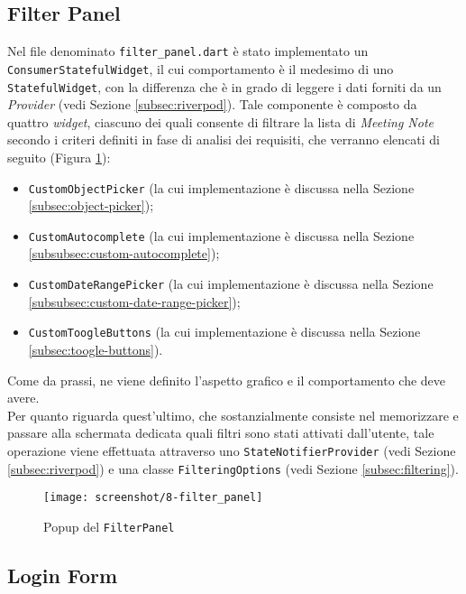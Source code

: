 \subsection{Filter Panel}
\label{subsec:filter-panel}

Nel file denominato \lstinline{filter_panel.dart} è stato implementato un \lstinline{ConsumerStatefulWidget}\cite{site:reading-provider}, il cui comportamento è il medesimo di uno \lstinline{StatefulWidget}, con la differenza che è in grado di leggere i dati forniti da un \emph{Provider} (vedi Sezione \ref{subsec:riverpod}).
Tale componente è composto da quattro \emph{widget}, ciascuno dei quali consente di filtrare la lista di \emph{Meeting Note}  secondo i criteri definiti in fase di analisi dei requisiti, che verranno elencati di seguito (Figura \ref{fig:filter-panel}):
\begin{itemize}
    \item \lstinline{CustomObjectPicker} (la cui implementazione è discussa nella Sezione \ref{subsec:object-picker});
    \item \lstinline{CustomAutocomplete} (la cui implementazione è discussa nella Sezione \ref{subsubsec:custom-autocomplete});
    \item \lstinline{CustomDateRangePicker} (la cui implementazione è discussa nella Sezione \ref{subsubsec:custom-date-range-picker});
    \item \lstinline{CustomToogleButtons} (la cui implementazione è discussa nella Sezione \ref{subsec:toogle-buttons}).
\end{itemize}
Come da prassi, ne viene definito l'aspetto grafico e il comportamento che deve avere.\\
Per quanto riguarda quest'ultimo, che sostanzialmente consiste nel memorizzare e passare alla schermata dedicata quali filtri sono stati attivati dall'utente, tale operazione viene effettuata attraverso uno \lstinline{StateNotifierProvider} (vedi Sezione \ref{subsec:riverpod}) e una classe \lstinline{FilteringOptions} (vedi Sezione \ref{subsec:filtering}).

\begin{figure}[!h] 
    \centering 
    \texttt{[image: screenshot/8-filter\_panel]} 
    \caption{Popup del \lstinline{FilterPanel}}
    \label{fig:filter-panel}
\end{figure}

\subsection{Login Form}
\label{subsec:login-form}

